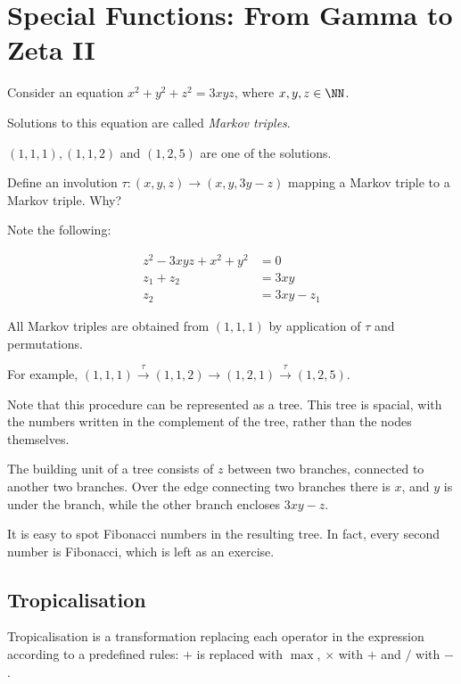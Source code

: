 \documentclass[11pt]{scrartcl}
\begin{document}
  \section*{Special Functions: From Gamma to Zeta II}

  Consider an equation $x^{2} + y^{2} + z^{2} = 3xyz$, where $x, y, z \in \NN$.

  Solutions to this equation are called \textit{Markov triples}.

  $(1, 1, 1), (1, 1, 2)$ and $(1, 2, 5)$ are one of the solutions.

  Define an involution $\tau: (x, y, z) \to (x, y, 3y - z)$ mapping a
  Markov triple to a Markov triple. Why?

  Note the following:

  \begin{align}
    z^{2} - 3xyz + x^{2}+y^{2} &= 0\\
    z_{1}+z_{2} &= 3xy\\
    z_{2} &= 3xy - z_{1}
  \end{align}

  \begin{theorem}[Markov]
    All Markov triples are obtained from $(1, 1, 1)$ by application of
    $\tau$ and permutations.
  \end{theorem}

  For example,
  $(1, 1, 1) \overset{\tau}{\to} (1, 1, 2) \to (1, 2, 1)
  \overset{\tau}{\to} (1, 2, 5)$.

  Note that this procedure can be represented as a tree. This tree is
  spacial, with the numbers written in the complement of the tree,
  rather than the nodes themselves.

  The building unit of a tree consists of $z$ between two branches,
  connected to another two branches. Over the edge connecting two
  branches there is $x$, and $y$ is under the branch, while the other
  branch encloses $3xy - z$.

  It is easy to spot Fibonacci numbers in the resulting tree. In fact,
  every second number is Fibonacci, which is left as an exercise.

  \subsection{Tropicalisation}

  Tropicalisation is a transformation replacing each operator in the
  expression according to a predefined rules: $+$ is replaced with
  $\max$, $\times$ with $+$ and $/$ with $-$.
\end{document}
